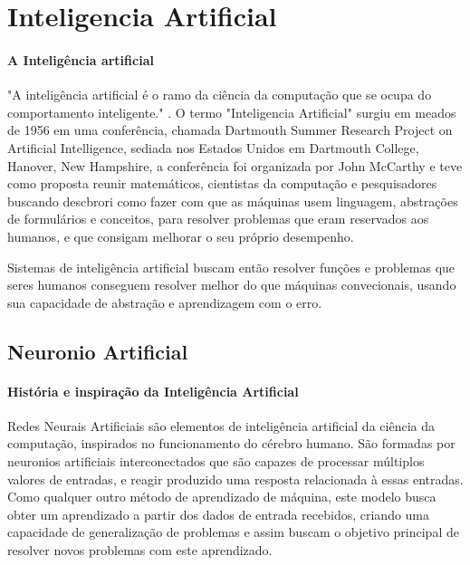 \documentclass[	12pt, Times, openright, twoside, a4paper, english, brazil]{abntex2}
\begin{document}
      \section{Inteligencia Artificial}
        \paragraph*{A Inteligência artificial} "A inteligência artificial é o ramo da ciência da computação que se ocupa do comportamento inteligente." \cite{Luger2004}.
          O termo "Inteligencia Artificial" surgiu em meados de 1956 em uma conferência, chamada Dartmouth Summer Research Project on Artificial Intelligence, sediada nos Estados Unidos em Dartmouth College, Hanover, New Hampshire, a conferência foi organizada por John McCarthy e teve como proposta reunir matemáticos, cientistas da computação e pesquisadores buscando descbrori como fazer com que as máquinas usem linguagem, abstrações de formulários e conceitos, para resolver problemas que eram reservados aos humanos, e que consigam melhorar o seu próprio desempenho.

          Sistemas de inteligência artificial buscam então resolver funções e problemas que seres humanos conseguem resolver melhor do que máquinas convecionais, usando sua capacidade de abstração e aprendizagem com o erro.

        \subsection{Neuronio Artificial}
         
          \paragraph*{História e inspiração da Inteligência Artificial}
            Redes Neurais Artificiais são elementos de inteligência artificial da ciência da computação, inspirados no funcionamento do cérebro humano.
            São formadas por neuronios artificiais interconectados que são capazes de processar múltiplos valores de entradas, e reagir produzido uma resposta relacionada à essas entradas.
            Como qualquer outro método de aprendizado de máquina, este modelo busca obter um aprendizado a partir dos dados de entrada recebidos, criando uma capacidade de generalização de problemas e assim buscam o objetivo principal de resolver novos problemas com este aprendizado.
\end{document}
